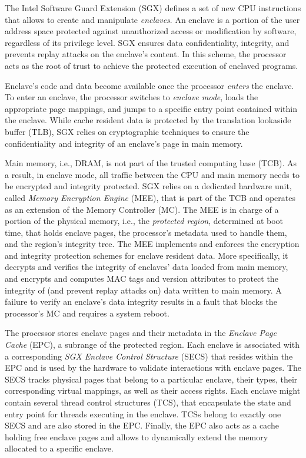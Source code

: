 % 
The Intel Software Guard Extension (SGX) defines a set of new CPU instructions that allows to create and manipulate \emph{enclaves}.
An enclave is a portion of the user address space protected against unauthorized access or modification by software, regardless of its privilege level.
SGX ensures data confidentiality, integrity, and prevents replay attacks on the enclave's content.
In this scheme, the processor acts as the root of trust to achieve the protected execution of enclaved programs.

Enclave's code and data become available once the processor \emph{enters} the enclave.
To enter an enclave, the processor switches to \emph{enclave mode}, loads the appropriate page mappings, and jumps to a specific entry point contained within the enclave.
While cache resident data is protected by the translation lookaside buffer (TLB), SGX relies on cryptographic techniques to ensure the confidentiality and integrity of an enclave's page in main memory.

Main memory, i.e., DRAM, is not part of the trusted computing base (TCB).
As a result, in enclave mode, all traffic between the CPU and main memory needs to be encrypted and integrity protected.
SGX relies on a dedicated hardware unit, called \emph{Memory Encryption Engine} (MEE), that is part of the TCB and operates as an extension of the Memory Controller (MC).
The MEE is in charge of a portion of the physical memory, i.e., the \emph{protected region}, determined at boot time, that holds enclave pages, the processor's metadata used to handle them, and the region's integrity tree.
The MEE implements and enforces the encryption and integrity protection schemes for enclave resident data.
More specifically, it decrypts and verifies the integrity of enclaves' data loaded from main memory, and encrypts and computes MAC tags and version attributes to protect the integrity of (and prevent replay attacks on) data written to main memory.
A failure to verify an enclave's data integrity results in a fault that blocks the processor's MC and requires a system reboot.

The processor stores enclave pages and their metadata in the \emph{Enclave Page Cache} (EPC), a subrange of the protected region.
Each enclave is associated with a corresponding \emph{SGX Enclave Control Structure} (SECS) that resides within the EPC and is used by the hardware to validate interactions with enclave pages.
The SECS tracks physical pages that belong to a particular enclave, their types, their corresponding virtual mappings, as well as their access rights.
Each enclave might contain several thread control structures (TCS), that encapsulate the state and entry point for threads executing in the enclave.
TCSs belong to exactly one SECS and are also stored in the EPC.
Finally, the EPC also acts as a cache holding free enclave pages and allows to dynamically extend the memory allocated to a specific enclave.

